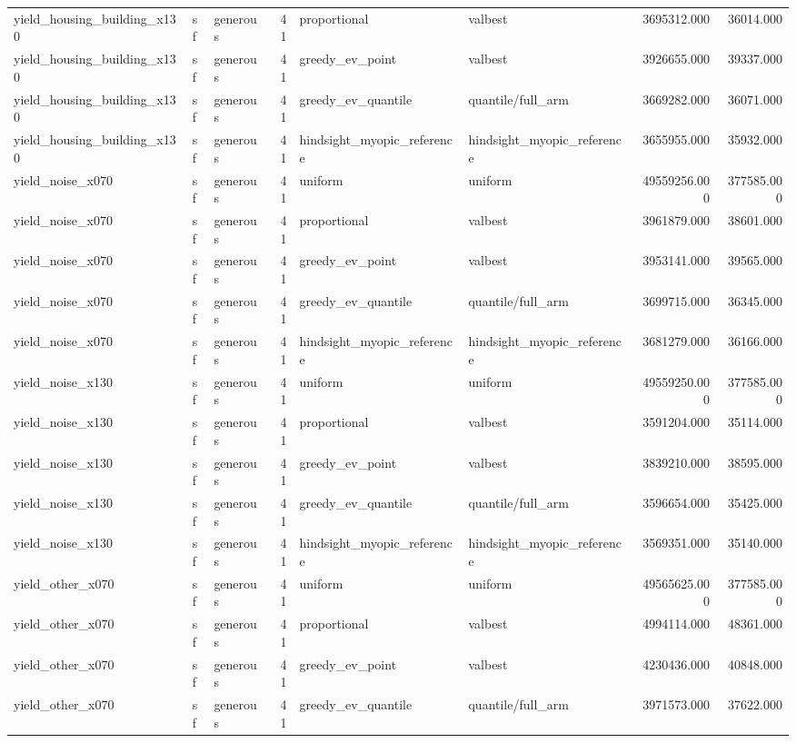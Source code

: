 \begin{tabular}{lllrllrr}
yield\_housing\_building\_x130 & sf & generous & 41 & proportional & valbest & 3695312.000 & 36014.000 \\
yield\_housing\_building\_x130 & sf & generous & 41 & greedy\_ev\_point & valbest & 3926655.000 & 39337.000 \\
yield\_housing\_building\_x130 & sf & generous & 41 & greedy\_ev\_quantile & quantile/full\_arm & 3669282.000 & 36071.000 \\
yield\_housing\_building\_x130 & sf & generous & 41 & hindsight\_myopic\_reference & hindsight\_myopic\_reference & 3655955.000 & 35932.000 \\
yield\_noise\_x070 & sf & generous & 41 & uniform & uniform & 49559256.000 & 377585.000 \\
yield\_noise\_x070 & sf & generous & 41 & proportional & valbest & 3961879.000 & 38601.000 \\
yield\_noise\_x070 & sf & generous & 41 & greedy\_ev\_point & valbest & 3953141.000 & 39565.000 \\
yield\_noise\_x070 & sf & generous & 41 & greedy\_ev\_quantile & quantile/full\_arm & 3699715.000 & 36345.000 \\
yield\_noise\_x070 & sf & generous & 41 & hindsight\_myopic\_reference & hindsight\_myopic\_reference & 3681279.000 & 36166.000 \\
yield\_noise\_x130 & sf & generous & 41 & uniform & uniform & 49559250.000 & 377585.000 \\
yield\_noise\_x130 & sf & generous & 41 & proportional & valbest & 3591204.000 & 35114.000 \\
yield\_noise\_x130 & sf & generous & 41 & greedy\_ev\_point & valbest & 3839210.000 & 38595.000 \\
yield\_noise\_x130 & sf & generous & 41 & greedy\_ev\_quantile & quantile/full\_arm & 3596654.000 & 35425.000 \\
yield\_noise\_x130 & sf & generous & 41 & hindsight\_myopic\_reference & hindsight\_myopic\_reference & 3569351.000 & 35140.000 \\
yield\_other\_x070 & sf & generous & 41 & uniform & uniform & 49565625.000 & 377585.000 \\
yield\_other\_x070 & sf & generous & 41 & proportional & valbest & 4994114.000 & 48361.000 \\
yield\_other\_x070 & sf & generous & 41 & greedy\_ev\_point & valbest & 4230436.000 & 40848.000 \\
yield\_other\_x070 & sf & generous & 41 & greedy\_ev\_quantile & quantile/full\_arm & 3971573.000 & 37622.000 \\

\end{tabular}
